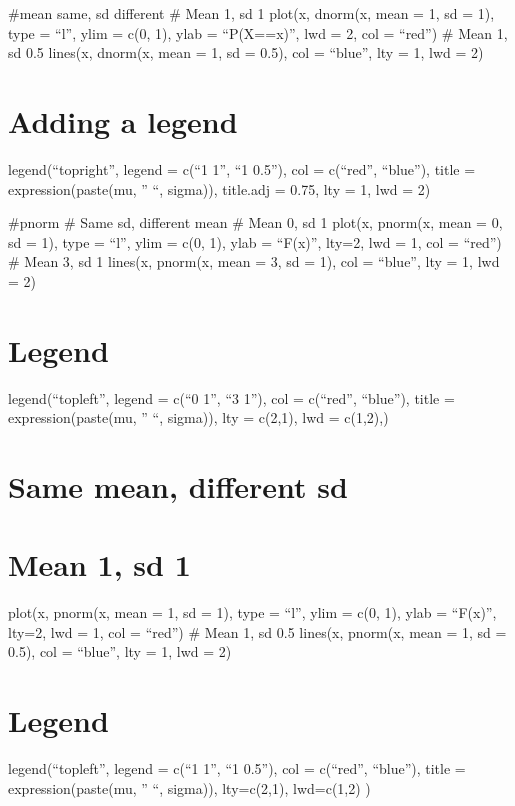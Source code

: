 \documentclass[
]{article}
\begin{document}
\#mean same, sd different \# Mean 1, sd 1 plot(x, dnorm(x, mean = 1, sd
= 1), type = ``l'', ylim = c(0, 1), ylab = ``P(X==x)'', lwd = 2, col =
``red'') \# Mean 1, sd 0.5 lines(x, dnorm(x, mean = 1, sd = 0.5), col =
``blue'', lty = 1, lwd = 2)

\hypertarget{adding-a-legend}{%
\section{Adding a legend}\label{adding-a-legend}}

legend(``topright'', legend = c(``1 1'', ``1 0.5''), col = c(``red'',
``blue''), title = expression(paste(mu, '' ``, sigma)), title.adj =
0.75, lty = 1, lwd = 2)

\#pnorm \# Same sd, different mean \# Mean 0, sd 1 plot(x, pnorm(x, mean
= 0, sd = 1), type = ``l'', ylim = c(0, 1), ylab = ``F(x)'', lty=2, lwd
= 1, col = ``red'') \# Mean 3, sd 1 lines(x, pnorm(x, mean = 3, sd = 1),
col = ``blue'', lty = 1, lwd = 2)

\hypertarget{legend}{%
\section{Legend}\label{legend}}

legend(``topleft'', legend = c(``0 1'', ``3 1''), col = c(``red'',
``blue''), title = expression(paste(mu, '' ``, sigma)), lty = c(2,1),
lwd = c(1,2),)

\hypertarget{same-mean-different-sd}{%
\section{Same mean, different sd}\label{same-mean-different-sd}}

\hypertarget{mean-1-sd-1}{%
\section{Mean 1, sd 1}\label{mean-1-sd-1}}

plot(x, pnorm(x, mean = 1, sd = 1), type = ``l'', ylim = c(0, 1), ylab =
``F(x)'', lty=2, lwd = 1, col = ``red'') \# Mean 1, sd 0.5 lines(x,
pnorm(x, mean = 1, sd = 0.5), col = ``blue'', lty = 1, lwd = 2)

\hypertarget{legend-1}{%
\section{Legend}\label{legend-1}}

legend(``topleft'', legend = c(``1 1'', ``1 0.5''), col = c(``red'',
``blue''), title = expression(paste(mu, '' ``, sigma)), lty=c(2,1),
lwd=c(1,2) )
\end{document}
